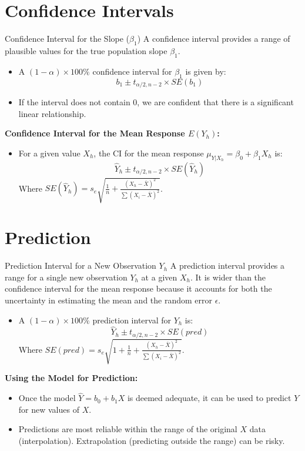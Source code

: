 \documentclass[aspectratio=169]{beamer}
\begin{document}
\section{Confidence Intervals}
\begin{frame}{Confidence Interval for the Slope ($\beta_1$)}
  A confidence interval provides a range of plausible values for the true population slope $\beta_1$.
  \begin{itemize}
    \item A $(1-\alpha) \times 100\%$ confidence interval for $\beta_1$ is given by:
    \begin{equation*}
      b_1 \pm t_{\alpha/2, n-2} \times SE(b_1)
    \end{equation*}
    \item If the interval does not contain 0, we are confident that there is a significant linear relationship.
  \end{itemize}
  \textbf{Confidence Interval for the Mean Response $E(Y_h)$:}
  \begin{itemize}
    \item For a given value $X_h$, the CI for the mean response $\mu_{Y|X_h} = \beta_0 + \beta_1 X_h$ is:
    \begin{equation*}
      \hat{Y}_h \pm t_{\alpha/2, n-2} \times SE(\hat{Y}_h)
    \end{equation*}
    Where $SE(\hat{Y}_h) = s_e \sqrt{\frac{1}{n} + \frac{(X_h - \bar{X})^2}{\sum (X_i - \bar{X})^2}}$.
  \end{itemize}
\end{frame}

\section{Prediction}
\begin{frame}{Prediction Interval for a New Observation $Y_h$}
  A prediction interval provides a range for a single new observation $Y_h$ at a given $X_h$. It is wider than the confidence interval for the mean response because it accounts for both the uncertainty in estimating the mean and the random error $\epsilon$.
  \begin{itemize}
    \item A $(1-\alpha) \times 100\%$ prediction interval for $Y_h$ is:
    \begin{equation*}
      \hat{Y}_h \pm t_{\alpha/2, n-2} \times SE(pred)
    \end{equation*}
    Where $SE(pred) = s_e \sqrt{1 + \frac{1}{n} + \frac{(X_h - \bar{X})^2}{\sum (X_i - \bar{X})^2}}$.
  \end{itemize}
  \textbf{Using the Model for Prediction:}
  \begin{itemize}
    \item Once the model $\hat{Y} = b_0 + b_1 X$ is deemed adequate, it can be used to predict $Y$ for new values of $X$.
    \item Predictions are most reliable within the range of the original $X$ data (interpolation). Extrapolation (predicting outside the range) can be risky.
  \end{itemize}
\end{frame}
\end{document}
